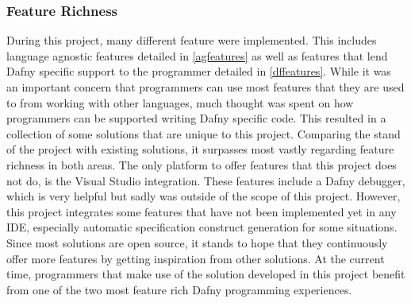 \subsubsection{Feature Richness}
During this project, many different feature were implemented. This includes language agnostic features detailed in \ref{agfeatures} as well as features that lend Dafny specific support to the programmer detailed in \ref{dffeatures}. While it was an important concern that programmers can use most features that they are used to from working with other languages, much thought was spent on how programmers can be supported writing Dafny specific code. This resulted in a collection of some solutions that are unique to this project. \newline
Comparing the stand of the project with existing solutions, it surpasses most vastly regarding feature richness in both areas. The only platform to offer features that this project does not do, is the Visual Studio integration. These features include a Dafny debugger, which is very helpful but sadly was outside of the scope of this project. However, this project integrates some features that have not been implemented yet in any IDE, especially automatic specification construct generation for some situations. \newline
Since most solutions are open source, it stands to hope that they continuously offer more features by getting inspiration from other solutions. At the current time, programmers that make use of the solution developed in this project benefit from one of the two most feature rich Dafny programming experiences. 



